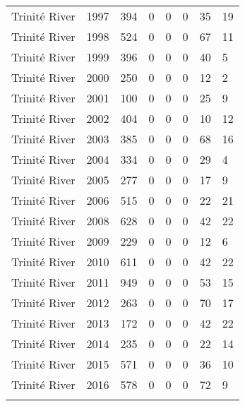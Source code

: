 \begin{longtable}{p{3cm}p{1cm}p{1.3cm}p{1.3cm}p{1.3cm}p{1.3cm}p{1.3cm}p{1.3cm}}
  Trinité River & 1997 & 394 & 0 & 0 & 0 & 35 & 19 \\ 
  Trinité River & 1998 & 524 & 0 & 0 & 0 & 67 & 11 \\ 
  Trinité River & 1999 & 396 & 0 & 0 & 0 & 40 & 5 \\ 
  Trinité River & 2000 & 250 & 0 & 0 & 0 & 12 & 2 \\ 
  Trinité River & 2001 & 100 & 0 & 0 & 0 & 25 & 9 \\ 
  Trinité River & 2002 & 404 & 0 & 0 & 0 & 10 & 12 \\ 
  Trinité River & 2003 & 385 & 0 & 0 & 0 & 68 & 16 \\ 
  Trinité River & 2004 & 334 & 0 & 0 & 0 & 29 & 4 \\ 
  Trinité River & 2005 & 277 & 0 & 0 & 0 & 17 & 9 \\ 
  Trinité River & 2006 & 515 & 0 & 0 & 0 & 22 & 21 \\ 
  Trinité River & 2008 & 628 & 0 & 0 & 0 & 42 & 22 \\ 
  Trinité River & 2009 & 229 & 0 & 0 & 0 & 12 & 6 \\ 
  Trinité River & 2010 & 611 & 0 & 0 & 0 & 42 & 22 \\ 
  Trinité River & 2011 & 949 & 0 & 0 & 0 & 53 & 15 \\ 
  Trinité River & 2012 & 263 & 0 & 0 & 0 & 70 & 17 \\ 
  Trinité River & 2013 & 172 & 0 & 0 & 0 & 42 & 22 \\ 
  Trinité River & 2014 & 235 & 0 & 0 & 0 & 22 & 14 \\ 
  Trinité River & 2015 & 571 & 0 & 0 & 0 & 36 & 10 \\ 
  Trinité River & 2016 & 578 & 0 & 0 & 0 & 72 & 9 \\ 
   \hline
\hline
\label{tab:scales}
\end{longtable}
\endgroup
